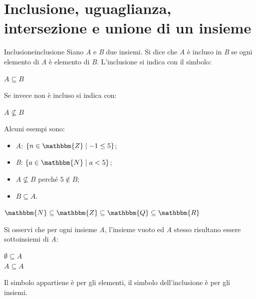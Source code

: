\documentclass[12pt, letterpaper]{report}
\newcounter{definition}
\newcommand{\nmu}{}
\begin{document}
	\section{Inclusione, uguaglianza, intersezione e unione di un insieme}
	\begin{definition}{\nmu Inclusione}{inclusione}
		Siano \textit{A} e \textit{B} due insiemi. Si dice che \textit{A} è incluso in \textit{B} se ogni elemento di \textit{A} è elemento di \textit{B}. L'inclusione si indica con il simbolo:
		\begin{center}
			$A \subseteq B$
		\end{center}
		Se invece non è incluso si indica con:
		\begin{center}
			$A \not \subseteq B$
		\end{center}
	\end{definition}
	\begin{description}
		\item Alcuni esempi sono:
		\begin{itemize}
			\item \textit{A}: $\{n \in \mathbbm{Z} \mid -1 \leq 5\}$;
			\item \textit{B}: $\{a \in \mathbbm{N} \mid a < 5\}$;
			\item $A \not \subseteq B$ perché $5 \notin B$;
			\item $B \subseteq A$.
		\end{itemize}
	\end{description}
	\begin{note}{}{}
		\begin{center}
		$\mathbbm{N} \subseteq \mathbbm{Z} \subseteq \mathbbm{Q} \subseteq \mathbbm{R}$
	\end{center}
	Si osservi che per ogni insieme \textit{A}, l'insieme vuoto ed \textit{A} stesso risultano essere sottoinsiemi di \textit{A}:
	\begin{center}
		$\emptyset \subseteq A$
		\\$A \subseteq A$
	\end{center}

	\end{note}
	\begin{note}{}{}
	Il simbolo appartiene è per gli elementi, il simbolo dell'inclusione è per gli insiemi.
	\end{note}
\end{document}

